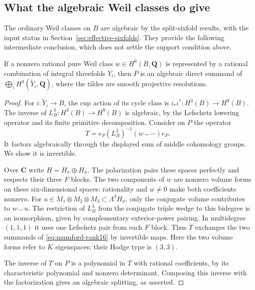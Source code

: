 \subsection{What the algebraic Weil classes do give}

The ordinary Weil classes on $B$ are algebraic by the split-sixfold
results, with the input status in Section~\ref{sec:effective-sixfolds}.
They provide the following intermediate conclusion, which does not
settle the support condition above.

\begin{proposition}\label{prop:weil-support-middle}
If a nonzero rational pure Weil class $w\in H^6(B,\mathbf Q)$ is
represented by a rational combination of integral threefolds $Y_i$,
then $P$ is an algebraic direct summand of
$\bigoplus_i H^3(\widetilde Y_i,\mathbf Q)$, where the tildes are
smooth projective resolutions.
\end{proposition}

\begin{proof}
For $i:\widetilde Y_i\to B$, the cup action of its cycle class is
$i_*i^*:H^3(B)\to H^9(B)$.
The inverse of $L_B^3:H^3(B)\to H^9(B)$ is algebraic, by the
Lefschetz lowering operator and its finite primitive decomposition.
Consider on $P$ the operator
\[
 T=e_P(L_B^3)^{-1}(w\smile -)e_P.
\]
It factors algebraically through the displayed sum of middle
cohomology groups.  We show it is invertible.

Over $\mathbf C$ write $H=H_\sigma\oplus H_{\bar\sigma}$.
The polarization pairs these spaces perfectly and respects their
three $F$ blocks.  The two components of $w$ are nonzero volume
forms on these six-dimensional spaces: rationality and $w\ne0$
make both coefficients nonzero.  For
$u\in M_1\otimes M_2\otimes M_3\subset\Lambda^3H_\sigma$,
only the conjugate volume contributes to $w\smile u$.
The restriction of $L_B^3$ from the conjugate triple wedge to this
bidegree is an isomorphism, given by complementary exterior-power
pairing.  In multidegree $(1,1,1)$ it uses one Lefschetz pair from
each $F$ block.  Thus $T$ exchanges the two summands of
\eqref{eq:mumford-rank16} by invertible maps.  Here the two volume
forms refer to $K$ eigenspaces; their Hodge type is $(3,3)$.

The inverse of $T$ on $P$ is a polynomial in $T$ with rational
coefficients, by its characteristic polynomial and nonzero
determinant.  Composing this inverse with the factorization gives
an algebraic splitting, as asserted.
\end{proof}

